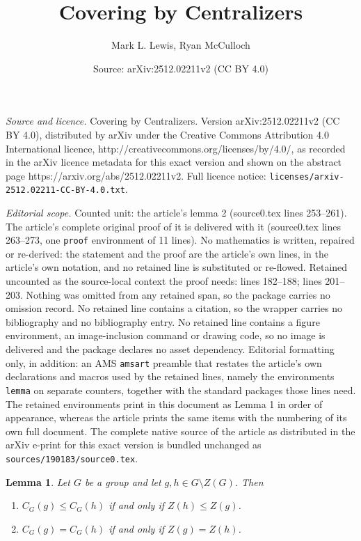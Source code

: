 \documentclass[10pt,a4paper]{amsart}
\title{Covering by Centralizers}
\author{Mark L. Lewis, Ryan McCulloch}
\date{Source: arXiv:2512.02211v2 (CC BY 4.0)}
\newtheorem{lemma}{Lemma}
\begin{document}
\maketitle

\noindent\emph{Source and licence.} Covering by Centralizers. Version arXiv:2512.02211v2 (CC BY 4.0), distributed by arXiv under the Creative Commons Attribution 4.0 International licence, http://creativecommons.org/licenses/by/4.0/, as recorded in the arXiv licence metadata for this exact version and shown on the abstract page https://arxiv.org/abs/2512.02211v2. Full licence notice: \texttt{licenses/arxiv-2512.02211-CC-BY-4.0.txt}.\par\smallskip

\noindent\textit{Editorial scope.} Counted unit: the article's lemma 2 (source0.tex lines 253--261). The article's complete original proof of it is delivered with it (source0.tex lines 263--273, one \texttt{proof} environment of 11 lines). No mathematics is written, repaired or re-derived: the statement and the proof are the article's own lines, in the article's own notation, and no retained line is substituted or re-flowed.  Retained uncounted as the source-local context the proof needs: lines 182--188; lines 201--203.  Nothing was omitted from any retained span, so the package carries no omission record.  No retained line contains a citation, so the wrapper carries no bibliography and no bibliography entry.  No retained line contains a figure environment, an image-inclusion command or drawing code, so no image is delivered and the package declares no asset dependency.  Editorial formatting only, in addition: an AMS \texttt{amsart} preamble that restates the article's own declarations and macros used by the retained lines, namely the environments \texttt{lemma} on separate counters, together with the standard packages those lines need.  The retained environments print in this document as Lemma 1 in order of appearance, whereas the article prints the same items with the numbering of its own full document.  The complete native source of the article as distributed in the arXiv e-print for this exact version is bundled unchanged as \texttt{sources/190183/source0.tex}.
\begin{lemma} \label{star 1}
Let $G$ be a group and let $g, h \in G \setminus Z(G)$.  Then 
\begin{enumerate}
\item $C_G (g) \le C_G (h)$ if and only if $Z(h) \le Z(g)$.
\item $C_G (g) = C_G (h)$ if and only if $Z (g) = Z(h)$.
\end{enumerate}
\end{lemma}
\end{document}
